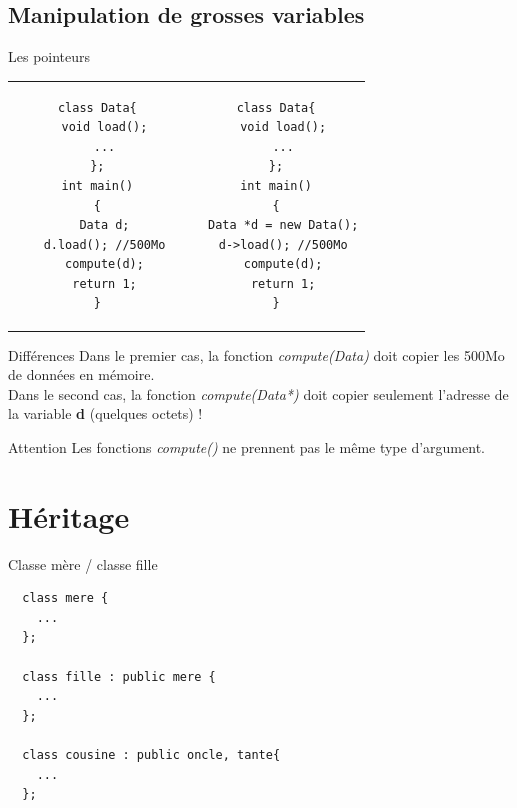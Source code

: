\documentclass{beamer}
\begin{document}
\subsection*{Manipulation de grosses variables}
\begin{frame}[fragile]{Les pointeurs}

  \begin{scriptsize}
    \begin{tabular}{c c}
      \begin{minipage}{0.5\linewidth}
\begin{verbatim}
  class Data{
    void load();
    ...
  };
  int main()
  {
    Data d;
    d.load(); //500Mo
    compute(d);
    return 1;
  }
\end{verbatim}
      \end{minipage}
      &
      \begin{minipage}{0.5\linewidth}
\begin{verbatim}
  class Data{
    void load();
    ...
  };
  int main()
  {
    Data *d = new Data();
    d->load(); //500Mo
    compute(d);
    return 1;
  }
\end{verbatim}
      \end{minipage}
    \end{tabular}
  \end{scriptsize}
    \vspace{2mm}
  \begin{small}
    \begin{block}{Différences}
      Dans le premier cas, la fonction \textit{compute(Data)} doit copier les 500Mo de données en mémoire.\\
      Dans le second cas, la fonction \textit{compute(Data*)} doit copier seulement l'adresse de la variable \textbf{d} (quelques octets) ! 
    \end{block}
    \begin{block}{Attention}
      Les fonctions \textit{compute()} ne prennent pas le même type d'argument.
    \end{block}
  \end{small}
\end{frame}


\section{Héritage}
\begin{frame}[fragile]{Classe mère / classe fille}
  \begin{scriptsize}
\begin{verbatim}
  class mere {
    ...
  };

  class fille : public mere {
    ...
  };
  
  class cousine : public oncle, tante{
    ...
  }; 
\end{verbatim}
  \end{scriptsize}
\end{frame}
\end{document}
